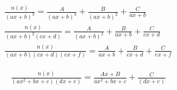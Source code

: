 \begin{align}
&\frac{n(x)}{(ax+b)^3}=\frac{A}{(ax+b)^3}+\frac{B}{(ax+b)^2}+\frac{C}{ax+b} \\
&\frac{n(x)}{(ax+b)^2(cx+d)}=\frac{A}{(ax+b)^2}+\frac{B}{ax+b}+\frac{C}{cx+d} \\
&\frac{n(x)}{(ax+b)(cx+d)(ex+f)}=\frac{A}{ax+b}+\frac{B}{cx+d}+\frac{C}{ex+f}
\end{align}

\begin{align}
&\frac{n(x)}{(ax^2+bx+c)(dx+e)}=\frac{Ax+B}{ax^2+bx+c}+\frac{C}{(dx+e)}
\end{align}
